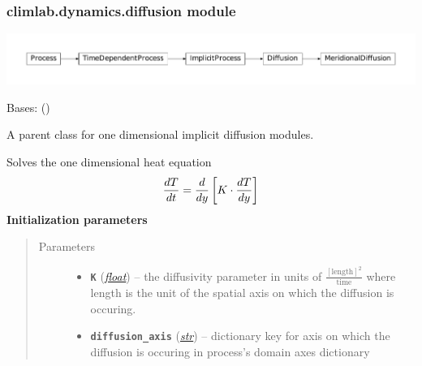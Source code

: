 \documentclass[a4paper,10pt,english]{sphinxmanual}
\begin{document}
\subsubsection{climlab.dynamics.diffusion module}
\label{api/climlab.dynamics:climlab-dynamics-diffusion-module}
\includegraphics{inheritance-804892074707de77374c9484dbf91ce4dddd70eb.pdf}
\label{api/climlab.dynamics:module-climlab.dynamics.diffusion}

\begin{fulllineitems}
\label{api/climlab.dynamics:climlab.dynamics.diffusion.Diffusion}
Bases: {\hyperref[api/climlab.process:climlab.process.implicit.ImplicitProcess]{\emph{}}} ()

A parent class for one dimensional implicit diffusion modules.

Solves the one dimensional heat equation
\begin{gather}
\begin{split}\frac{dT}{dt} = \frac{d}{dy} \left[ K \cdot \frac{dT}{dy} \right]\end{split}\notag
\end{gather}
\textbf{Initialization parameters}
\begin{quote}\begin{description}
\item[{Parameters}] \leavevmode\begin{itemize}
\item {} 
\textbf{\texttt{K}} (\href{http://docs.python.org/2.7/library/functions.html\#float}{\emph{float}}) -- the diffusivity parameter in units of 
\(\frac{[\textrm{length}]^2}{\textrm{time}}\)
where length is the unit of the spatial axis
on which the diffusion is occuring.

\item {} 
\textbf{\texttt{diffusion\_axis}} (\href{http://docs.python.org/2.7/library/functions.html\#str}{\emph{str}}) -- dictionary key for axis on which the 
diffusion is occuring in process's domain
axes dictionary


\end{itemize}
\end{description}
\end{quote}
\end{fulllineitems}
\end{document}
